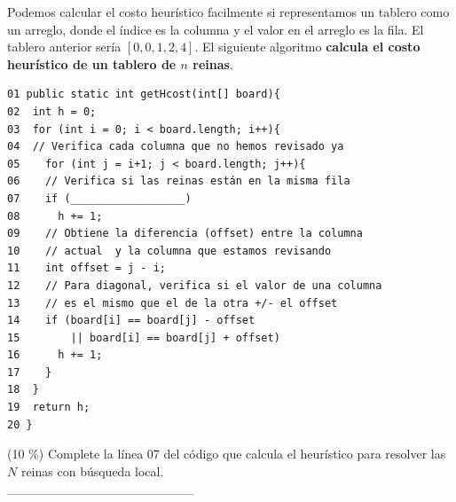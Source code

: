 \documentclass[twocolumn]{article}
\begin{document}
Podemos calcular el costo heurístico facilmente si representamos un
tablero como un arreglo, donde el índice es la columna y el valor en el
arreglo es la fila. El tablero anterior sería
$[0,0,1,2,4]$. El siguiente algoritmo \textbf{calcula el costo heurístico de
un tablero de $n$ reinas}.

{\small
\begin{verbatim}
01 public static int getHcost(int[] board){
02  int h = 0;
03  for (int i = 0; i < board.length; i++){
04  // Verifica cada columna que no hemos revisado ya
05    for (int j = i+1; j < board.length; j++){ 
06    // Verifica si las reinas están en la misma fila
07    if (__________________)
08      h += 1;
09    // Obtiene la diferencia (offset) entre la columna
10    // actual  y la columna que estamos revisando 
11    int offset = j - i;
12    // Para diagonal, verifica si el valor de una columna
13    // es el mismo que el de la otra +/- el offset
14    if (board[i] == board[j] - offset 
15        || board[i] == board[j] + offset)
16      h += 1;     
17    }
18  }
19  return h;
20 }
\end{verbatim}
}

(10 \%) Complete la línea 07 del código que calcula el heurístico
para resolver las $N$ reinas con búsqueda local.\\

\_\_\_\_\_\_\_\_\_\_\_\_\_\_\_\_\_\_\_\_



\end{document}
